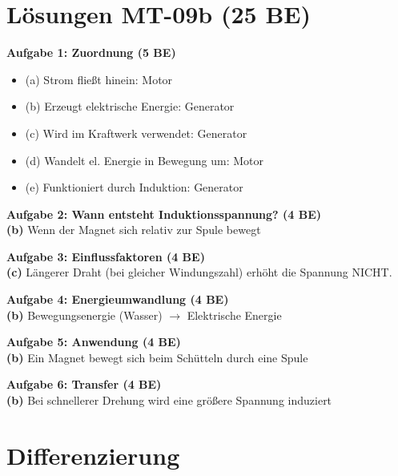 \documentclass[a4paper,11pt]{article}
\begin{document}
\section*{Lösungen MT-09b (25 BE)}

\begin{successbox}

\textbf{Aufgabe 1: Zuordnung (5 BE)}
\begin{itemize}[noitemsep]
    \item (a) Strom fließt hinein: Motor
    \item (b) Erzeugt elektrische Energie: Generator
    \item (c) Wird im Kraftwerk verwendet: Generator
    \item (d) Wandelt el. Energie in Bewegung um: Motor
    \item (e) Funktioniert durch Induktion: Generator
\end{itemize}

\textbf{Aufgabe 2: Wann entsteht Induktionsspannung? (4 BE)}\\
\textbf{(b)} Wenn der Magnet sich relativ zur Spule bewegt

\textbf{Aufgabe 3: Einflussfaktoren (4 BE)}\\
\textbf{(c)} Längerer Draht (bei gleicher Windungszahl) erhöht die Spannung NICHT.

\textbf{Aufgabe 4: Energieumwandlung (4 BE)}\\
\textbf{(b)} Bewegungsenergie (Wasser) $\rightarrow$ Elektrische Energie

\textbf{Aufgabe 5: Anwendung (4 BE)}\\
\textbf{(b)} Ein Magnet bewegt sich beim Schütteln durch eine Spule

\textbf{Aufgabe 6: Transfer (4 BE)}\\
\textbf{(b)} Bei schnellerer Drehung wird eine größere Spannung induziert

\end{successbox}

\vspace{5mm}

\section*{Differenzierung}
\end{document}
